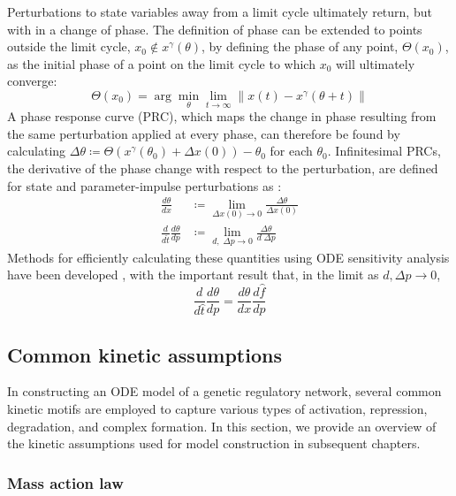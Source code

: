 Perturbations to state variables away from a limit cycle ultimately return, but with in a change of phase.
The definition of phase can be extended to points outside the limit cycle, $x_0 \not\in x^\gamma(\theta)$, by defining the phase of any point, $\Theta(x_0)$, as the initial phase of a point on the limit cycle to which $x_0$ will ultimately converge:
\begin{equation}
  \Theta(x_0) = \arg\min_\theta \lim_{t \to \infty} \lVert x(t)
  - x^\gamma(\theta + t)\rVert
  \label{eq:extendedphase2}
\end{equation}
A phase response curve (PRC), which maps the change in phase resulting from the same
perturbation applied at every phase, can therefore be found by calculating $
\Delta\theta \coloneqq \Theta(x^\gamma(\theta_0) + \Delta x(0)) - \theta_0$ for each
$\theta_0$. Infinitesimal PRCs, the derivative of the phase
change with respect to the perturbation, are defined for state and
parameter-impulse perturbations as \cite{Taylor2008a}:
\begin{align}
  \frac{d\theta}{dx} &\coloneqq \lim_{\Delta x(0) \to 0} \frac{\Delta\theta}{\Delta
  x(0)} \label{eq:sPRC}\\
  \frac{d}{d\hat{t}}\frac{d\theta}{dp} &\coloneqq \lim_{d,\; \Delta p \to 0}
  \frac{\Delta\theta}{d \; \Delta p}
  \label{eq:PRC}
\end{align}
Methods for efficiently calculating these quantities using ODE sensitivity
analysis have been developed \cite{Taylor2008a}, with the important result
that, in the limit as $d, \Delta p \to 0$, 
\begin{equation}
  \frac{d}{d\hat{t}}\frac{d\theta}{dp} = \frac{d\theta}{dx}\frac{d\hat{f}}{dp} 
  \label{eq:pPRCequiv}
\end{equation}

\subsection{Common kinetic assumptions}\label{sec:kinetic}

In constructing an ODE model of a genetic regulatory network, several common kinetic motifs are employed to capture various types of activation, repression, degradation, and complex formation.
In this section, we provide an overview of the kinetic assumptions used for model construction in subsequent chapters.

\subsubsection{Mass action law}

